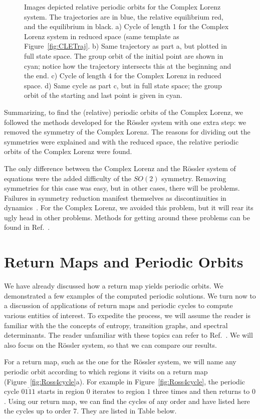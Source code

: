 \documentclass[10pt,letter]{article}
\begin{document}
\begin{figure}
\caption{Images depicted relative periodic orbits for the Complex Lorenz
system.  The trajectories are in blue, the relative equilibrium red, and
the equilibrium in black.
a) Cycle of length 1 for the Complex Lorenz system in reduced space (same
template as Figure~\ref{fig:CLETraj}.
b) Same trajectory as part a, but plotted in full state space.  The group
orbit of the initial point are shown in cyan; notice how the trajectory
intersects this at the beginning and the end.
c) Cycle of length $4$ for the Complex Lorenz in reduced space.
d) Same cycle as part c, but in full state space; the group orbit of the
starting and last point is given in cyan. }
 \label{fig:CLEPO}
\end{figure}

Summarizing, to find the (relative) periodic orbits of the Complex
Lorenz, we followed the methods developed for the R\"ossler system with
one extra step: we removed the symmetry of the Complex Lorenz.  The
reasons for dividing out the symmetries were explained and with the
reduced space, the relative periodic orbits of the Complex Lorenz were
found.

The only difference between the Complex Lorenz and the R\"ossler system
of equations were the added difficulty of the $SO(2)$ symmetry.  Removing
symmetries for this case was easy, but in other cases, there will be
problems.  Failures in symmetry reduction manifest themselves as
discontinuities in dynamics~\cite{Atl}.  For the Complex Lorenz, we
avoided this problem, but it will rear its ugly head in other problems.
Methods for getting around these problems can be found in Ref.~\cite{Atl}.

\section{Return Maps and Periodic Orbits}
\label{sec:Retmaps}
We have already discussed how a return map yields periodic orbits.  We
demonstrated a few examples of the computed periodic solutions.  We turn
now to a discussion of applications of return maps and periodic cycles to
compute various entities of interest.  To expedite the process, we will
assume the reader is familiar with the the concepts of entropy,
transition graphs, and spectral determinants.  The reader unfamiliar with
these topics can refer to Ref.~\cite{CB}.  We will also focus on the R\"ossler
system, so that we can compare our results.

For a return map, such as the one for the R\"ossler system, we will name
any periodic orbit according to which regions it visits on a return map
(Figure~\ref{fig:Ross4cycle}a).  For example in
Figure~\ref{fig:Ross4cycle}, the periodic cycle $\overline{0111}$ starts
in region $0$ iterates to region $1$ three times and then returns to $0$.
Using our return map, we can find the cycles of any order and have listed
here the cycles up to order 7.  They are listed in Table below.
\end{document}
